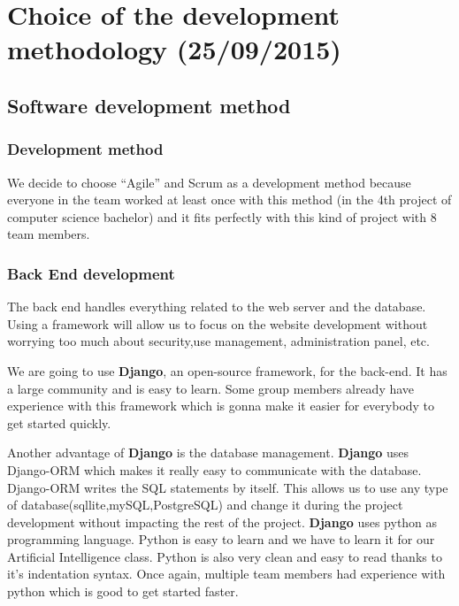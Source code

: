 \section{Choice of the development methodology (25/09/2015)}

\subsection{Software development method}

\subsubsection{Development method}
We decide to choose \enquote{Agile} and Scrum as a development method because
everyone in the team worked at least once with this method (in the 4th
project of computer science bachelor) and it fits perfectly with this
kind of project with 8 team members.\newline

\subsubsection{Back End development}
The back end handles everything related to the web server and the database. Using a framework will allow us to focus on the website development without worrying too much about security,use management, administration panel, etc.\newline

We are going to use \textbf{Django}, an open-source framework, for the back-end. It has a large community and is easy to learn. Some group members already have experience with this framework which is gonna make it easier for everybody to get started quickly.\newline

Another advantage of \textbf{Django} is the database management. \textbf{Django} uses Django-ORM which makes it really easy to communicate with the database. Django-ORM writes the SQL statements by itself. This allows us to use any type of database(sqllite,mySQL,PostgreSQL) and change it during the project development without impacting the rest of the project.
\textbf{Django} uses python as programming language. Python is easy to learn and we have to learn it for our Artificial Intelligence class.
Python is also very clean and easy to read thanks to it's indentation syntax. Once again, multiple team members had experience with python which is good to get started faster.\newline

